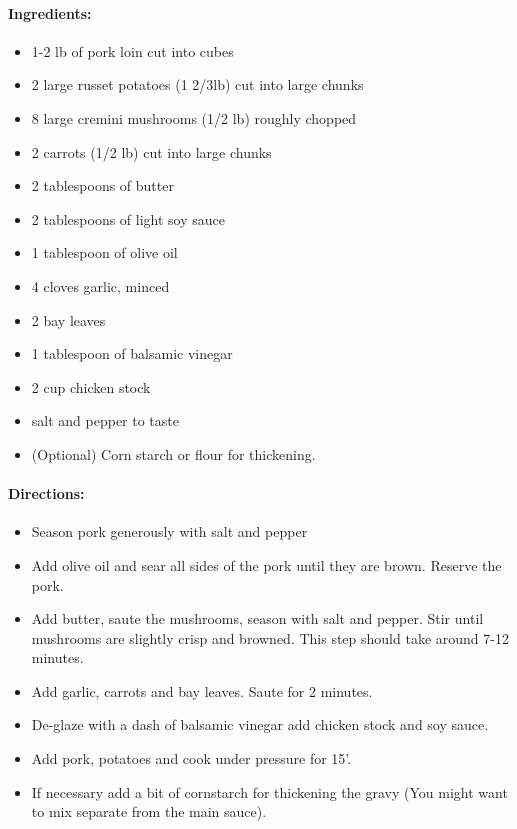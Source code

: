 \documentclass{article}
\begin{document}
\paragraph{Ingredients:}
\begin{itemize}
    \item 1-2 lb of pork loin cut into cubes
    \item 2 large russet potatoes (1 2/3lb) cut into large chunks
    \item 8 large cremini mushrooms (1/2 lb) roughly chopped
    \item 2 carrots (1/2 lb) cut into large chunks
    \item 2 tablespoons of butter
    \item 2 tablespoons of light soy sauce
    \item 1 tablespoon of olive oil
    \item 4 cloves garlic, minced
    \item 2 bay leaves
    \item 1 tablespoon of balsamic vinegar
    \item 2 cup chicken stock
    \item salt and pepper to taste
    \item (Optional) Corn starch or flour for thickening.
\end{itemize}

\paragraph{Directions:}
\begin{itemize}
    \item Season pork generously with salt and pepper
    \item Add olive oil and sear all sides of the pork until they are brown. Reserve the pork.
    \item Add butter, saute the mushrooms, season with salt and pepper. Stir until mushrooms are slightly crisp and browned. This step should take around 7-12 minutes.
    \item Add garlic, carrots and bay leaves. Saute for 2 minutes.
    \item De-glaze with a dash of balsamic vinegar add chicken stock and soy sauce.
    \item Add pork, potatoes and cook under pressure for 15’.
    \item If necessary add a bit of cornstarch for thickening the gravy (You might want to mix separate from the main sauce).
\end{itemize}
\end{document}

